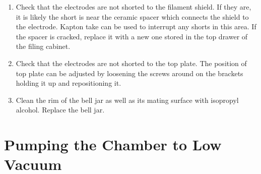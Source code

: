 \documentclass{thesis-umich}
\begin{document}
\begin{enumerate}
	\item Check that the electrodes are not shorted to the filament shield. If they are, it is likely the short is near the ceramic spacer which connects the shield to the electrode. Kapton take can be used to interrupt any shorts in this area. If the spacer is cracked, replace it with a new one stored in the top drawer of the filing cabinet.
	\item Check that the electrodes are not shorted to the top plate. The position of top plate can be adjusted by loosening the screws around on the brackets holding it up and repositioning it.
	\item Clean the rim of the bell jar as well as its mating surface with isopropyl alcohol. Replace the bell jar.
\end{enumerate}

\section{Pumping the Chamber to Low Vacuum}
\label{evap:pump}
\end{document}

